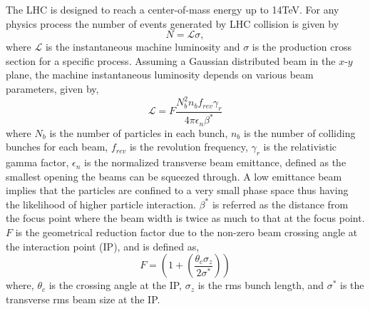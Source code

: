 The LHC is designed to reach a center-of-mass energy up to 14\unit{TeV}. For any physics process the number of events generated by LHC
collision is given by
\begin{equation}
N = \mathcal{L}\sigma,
\end{equation}
where $\mathcal{L}$ is the instantaneous machine luminosity and $\sigma$ is the production cross section for a specific process. 
Assuming a Gaussian distributed beam in the $x$-$y$ plane, the machine instantaneous luminosity depends on various beam parameters, given by,
\begin{equation}
\mathcal{L} = F\frac{N^{2}_{b}n_{b}f_{rev}\gamma_{r}}{4\pi\epsilon_{n}\beta^{\ast}}
\end{equation}
where $N_{b}$ is the number of particles in each bunch, $n_{b}$ is the number of colliding bunches for each beam, $f_{rev}$ is the revolution 
frequency, $\gamma_{r}$ is the relativistic gamma factor, $\epsilon_{n}$ is the normalized transverse beam emittance, defined as the smallest 
opening the beams can be squeezed through. A low emittance beam implies that the particles are confined to a very small phase space thus having
the likelihood of higher particle interaction. $\beta^{\ast}$ is referred as the distance from the focus point where the beam width is twice as 
much to that at the focus point. $F$ is the geometrical reduction factor due to the non-zero beam crossing angle at the interaction point (IP), and is 
defined as,
\begin{equation}
F = \left(1+\left(\frac{\theta_{c}\sigma_{z}}{2\sigma^{\ast}}\right)\right)
\end{equation}
where, $\theta_{c}$ is the crossing angle at the IP, $\sigma_{z}$ is the rms bunch length, and $\sigma^{\ast}$ is the transverse
rms beam size at the IP.

